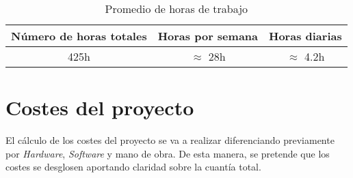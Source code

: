 \begin{figure}[ht!]
	\begin{center}
	\end{center}
	\label{gantt}
\end{figure}

\begin{table}[ht!]
	\centering
	\begin{tabular}{|c|c|c|}
		\hline
		\rowcolor[HTML]{EFEFEF}
		\textbf{Número de horas totales} & \textbf{Horas por semana} & \textbf{Horas diarias} \\ \hline
		425h                             & $\approx$ 28h             & $\approx$ 4.2h         \\ \hline
	\end{tabular}
	\caption{Promedio de horas de trabajo }
	\label{dig:horasTrabajadas}
\end{table}

\section{Costes del proyecto}

El cálculo de los costes del proyecto se va a realizar diferenciando previamente por \textit{Hardware}, \textit{Software} y mano de obra. De esta manera, se pretende que los costes se desglosen aportando claridad sobre la cuantía total.

